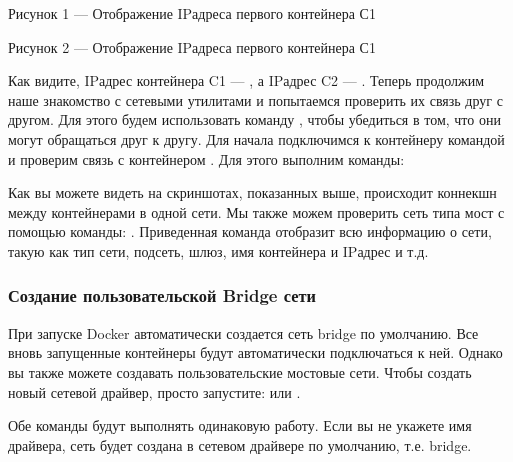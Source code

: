 \documentclass[letterpaper,10pt,russian]{sphinxmanual}
\begin{document}
\sphinxAtStartPar
Рисунок 1 — Отображение IP\sphinxhyphen{}адреса первого контейнера С1

\sphinxAtStartPar
{}
Рисунок 2 — Отображение IP\sphinxhyphen{}адреса первого контейнера С1

\sphinxAtStartPar
Как видите, IP\sphinxhyphen{}адрес контейнера C1 — , а IP\sphinxhyphen{}адрес C2 — .
Теперь продолжим наше знакомство с сетевыми утилитами и попытаемся проверить их связь друг с другом. Для этого будем использовать команду , чтобы убедиться в том, что они могут обращаться друг к другу. Для начала подключимся к контейнеру  командой  и проверим связь с контейнером . Для этого выполним команды:

\begin{sphinxVerbatim}[commandchars=\\\{\}]
\end{sphinxVerbatim}

\sphinxAtStartPar
Как вы можете видеть на скриншотах, показанных выше, происходит коннекшн между контейнерами в одной сети. Мы также можем проверить сеть типа мост с помощью команды: . Приведенная команда отобразит всю информацию о сети, такую как тип сети, подсеть, шлюз, имя контейнера и IP\sphinxhyphen{}адрес и т.д.


\subsubsection{Создание пользовательской Bridge сети}
\label{\detokenize{educational_materials/docker_network/content:bridge}}
\sphinxAtStartPar
При запуске Docker автоматически создается сеть bridge по умолчанию. Все вновь запущенные контейнеры будут автоматически подключаться к ней. Однако вы также можете создавать пользовательские мостовые сети. Чтобы создать новый сетевой драйвер, просто запустите:  или .

\sphinxAtStartPar
Обе команды будут выполнять одинаковую работу. Если вы не укажете имя драйвера, сеть будет создана в сетевом драйвере по умолчанию, т.е. bridge.
\end{document}
